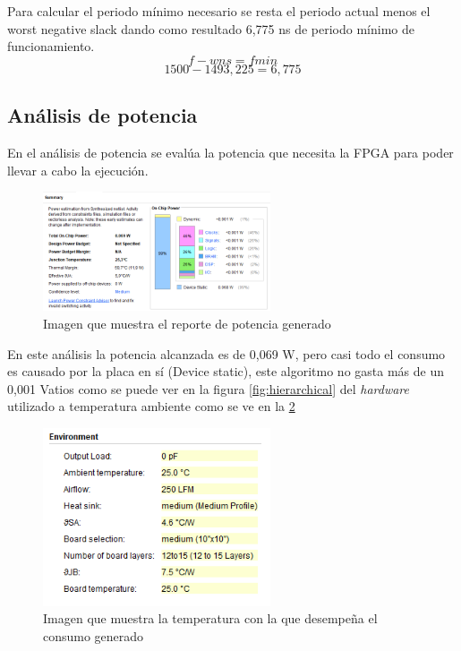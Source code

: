 	Para calcular el periodo mínimo necesario se resta el periodo actual menos el worst negative slack dando como resultado 6,775 ns de periodo mínimo de funcionamiento.  
	\[f - wns = f{min}\]
	\[1500 - 1493,225 = 6,775\]

	

\subsection{Análisis de potencia}

	En el análisis de potencia se evalúa la potencia que necesita la FPGA para poder llevar a cabo la ejecución.

	\begin{figure}[h!]
		\centering
		\includegraphics[width=0.6\textwidth]{./Images/img_res_experimentales/reportepower.png}
		\caption{Imagen que muestra el reporte de potencia generado}
		\label{fig:reportepotencia}
	\end{figure} 

	En este análisis la potencia alcanzada es de 0,069 W, pero casi todo el consumo es causado por la placa en sí (Device static), este algoritmo no gasta más de un 0,001 Vatios como se puede ver en la figura \cref*{fig:hierarchical} del  \textit{hardware}  utilizado a temperatura ambiente como se ve en la \cref*{fig:temperaturaambiente}

	\begin{figure}[h!]
		\centering
		\includegraphics[width=0.6\textwidth]{./Images/img_res_experimentales/temperaturaambientereportepower.png}
		\caption{Imagen que muestra la temperatura con la que desempeña el consumo generado}
		\label{fig:temperaturaambiente}
	\end{figure} 

